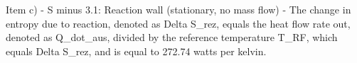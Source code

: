 Item c) 
- S minus 3.1: Reaction wall (stationary, no mass flow)
- The change in entropy due to reaction, denoted as Delta S_rez, equals the heat flow rate out, denoted as Q_dot_aus, divided by the reference temperature T_RF, which equals Delta S_rez, and is equal to 272.74 watts per kelvin.